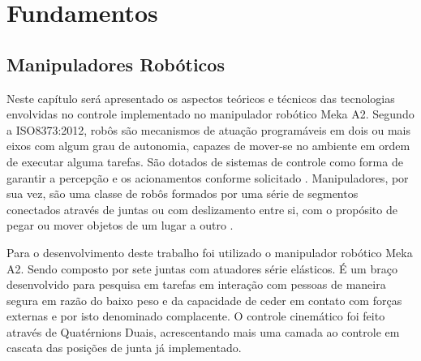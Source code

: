 \chapter{Fundamentos}\label{ch:teory-reference}





\section{Manipuladores Robóticos} 

Neste capítulo será apresentado os aspectos teóricos e técnicos das tecnologias envolvidas no controle implementado no manipulador robótico Meka A2. Segundo a ISO8373:2012, robôs são mecanismos de atuação programáveis em dois ou mais eixos com algum grau de autonomia, capazes de mover-se no ambiente em ordem de executar alguma tarefas. São dotados de sistemas de controle como forma de garantir a percepção e os acionamentos conforme solicitado \cite{nobody}. Manipuladores, por sua vez, são uma classe de robôs formados por uma série de segmentos conectados através de juntas ou com deslizamento entre si, com o propósito de pegar ou mover objetos de um lugar a outro \cite{nobody}.

Para o desenvolvimento deste trabalho foi utilizado o manipulador robótico Meka A2. Sendo composto por sete juntas com atuadores série elásticos. É um braço desenvolvido para pesquisa em tarefas em interação com pessoas de maneira segura em razão do baixo peso e da capacidade de ceder em contato com forças externas e por isto denominado complacente. O controle cinemático foi feito através de Quatérnions Duais, acrescentando mais uma camada ao controle em cascata das posições de junta já implementado.

